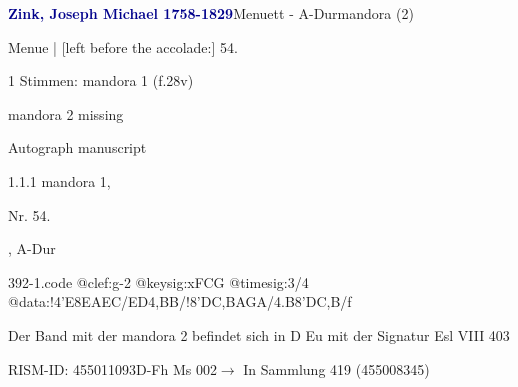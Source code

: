 \documentclass[twocolumn]{book}
\begin{document}
\par \vspace{7pt} \textcolor{darkblue}{\textbf{Zink, Joseph Michael  1758-1829}}\hfillplus{\textbf{[392]}}\newline Menuett - A-Dur\newline mandora (2)
\par \begin{itshape}[f.28v, at left:] Menue | [left before the accolade:] 54.\end{itshape} 
\par \textcolor{darkblue}{}  1 Stimmen: mandora 1  (f.28v)\newline \begin{small} mandora 2 missing\end{small} \newline Autograph manuscript
\par 1.1.1  mandora 1, \begin{itshape}Nr. 54.\end{itshape}, A-Dur  
\begin{filecontents*}{392-1.code}
@clef:g-2
@keysig:xFCG
@timesig:3/4
@data:!4'E{8EAEC}/{ED}4,BB/!{8'DC}{,BA}{GA}/4.B8'D{C,B}/f
\end{filecontents*}
\newline
%
\par Der Band mit der mandora 2 befindet sich in D Eu mit der Signatur Esl VIII 403
\par RISM-ID: 455011093\newline D-Fh  Ms 002\newline $\rightarrow$ In Sammlung 419 (455008345)
      
\end{document}

